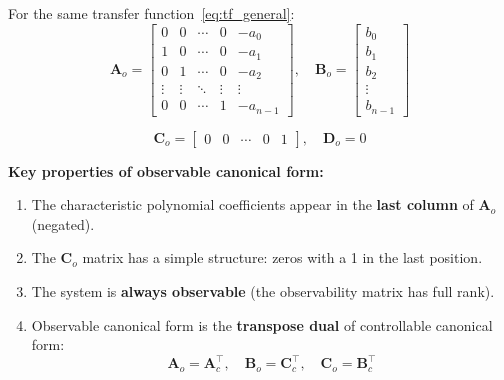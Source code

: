 For the same transfer function~\eqref{eq:tf_general}:
\begin{equation}
\mathbf{A}_o = \begin{bmatrix}
0 & 0 & \cdots & 0 & -a_0 \\
1 & 0 & \cdots & 0 & -a_1 \\
0 & 1 & \cdots & 0 & -a_2 \\
\vdots & \vdots & \ddots & \vdots & \vdots \\
0 & 0 & \cdots & 1 & -a_{n-1}
\end{bmatrix}, \quad
\mathbf{B}_o = \begin{bmatrix} b_0 \\ b_1 \\ b_2 \\ \vdots \\ b_{n-1} \end{bmatrix}
\label{eq:ocf_AB}
\end{equation}

\begin{equation}
\mathbf{C}_o = \begin{bmatrix} 0 & 0 & \cdots & 0 & 1 \end{bmatrix}, \quad \mathbf{D}_o = 0
\label{eq:ocf_CD}
\end{equation}

\textbf{Key properties of observable canonical form:}
\begin{enumerate}
    \item The characteristic polynomial coefficients appear in the \textbf{last column} of $\mathbf{A}_o$ (negated).
    \item The $\mathbf{C}_o$ matrix has a simple structure: zeros with a 1 in the last position.
    \item The system is \textbf{always observable} (the observability matrix has full rank).
    \item Observable canonical form is the \textbf{transpose dual} of controllable canonical form:
    \begin{equation}
    \mathbf{A}_o = \mathbf{A}_c^\top, \quad \mathbf{B}_o = \mathbf{C}_c^\top, \quad \mathbf{C}_o = \mathbf{B}_c^\top
    \end{equation}
\end{enumerate}

